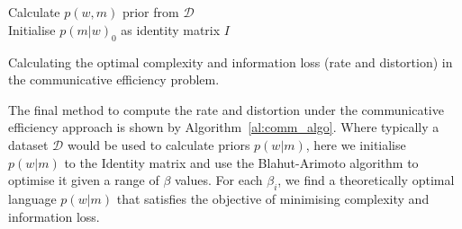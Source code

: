\documentclass[11pt]{article}
\begin{document}
\begin{algorithm}[h]
    \SetAlgoLined
     \\
     \\
    
    Calculate $p(w,m)$ prior from $\mathcal{D}$ \\
    Initialise $p(m|w)_0$ as identity matrix $I$ \\
 \caption{Calculating the optimal complexity and information loss (rate and distortion) in the communicative efficiency problem.}
 \label{al:comm_algo}
\end{algorithm}

The final method to compute the rate and distortion under the communicative efficiency approach is shown by Algorithm~\ref{al:comm_algo}.
Where typically a dataset $\mathcal{D}$ would be used to calculate priors $p(w|m)$, here we initialise $p(w|m)$ to the Identity matrix and use the Blahut-Arimoto algorithm to optimise it given a range of $\beta$ values.
For each $\beta_i$, we find a theoretically optimal language $p(w|m)$ that satisfies the objective of minimising complexity and information loss.
\end{document}
